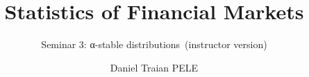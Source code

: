 \title[Statistics of Financial Markets]{Statistics of Financial Markets}
\subtitle{Seminar 3: α-stable distributions\ifsolutions\ (instructor version)\fi}
\author[D.T. Pele]{Daniel Traian PELE}
\date{}

\providecommand{\sfmapplink}[3]{\hypertarget{#2}{}\hyperlink{#1}{\beamergotobutton{#3}}}  %
\providecommand{\sfmappback}[2]{\begin{tikzpicture}[remember picture,overlay]\node[anchor=south east] at ([xshift=-3mm,yshift=7mm]current page.south east){\hyperlink{#1}{\beamerreturnbutton{#2}}};\end{tikzpicture}}  %
\providecommand{\sfmchlink}[2]{\href{#1}{#2}}  %
\providecommand{\sfmchlinkt}[2]{\href{#1}{\usebeamercolor[fg]{frametitle}#2}}  %


